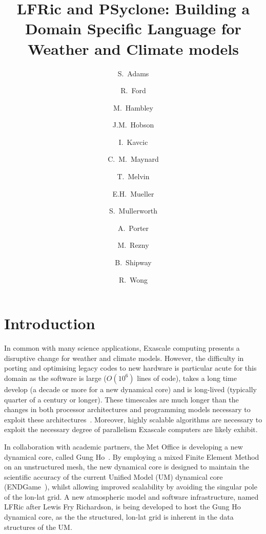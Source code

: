 \documentclass[times]{elsarticle}
\begin{document}
\begin{frontmatter}

\title{LFRic and PSyclone: Building a Domain Specific Language for Weather and Climate models}

\author[met]{S.~Adams}
\author[hartree]{R.~Ford}
\author[met]{M.~Hambley}
\author[met]{J.M.~Hobson}
\author[met]{I.~Kavcic}
\author[met,read]{C.~M.~Maynard}
\author[met]{T.~Melvin}
\author[bath]{E.H.~Mueller}
\author[met]{S.~Mullerworth}
\author[hartree]{A.~Porter}
\author[downunder]{M.~Rezny}
\author[met]{B.~Shipway}
\author[met]{R.~Wong}




\address[met]{Met Office, FitzRoy Road, Exeter, EX1 3PB}
\address[read]{Department of Computer Science, Polly Vacher Building,
  University of Reading, Reading, UK, RG6 6AY}
\address[bath]{Department of Mathematics, University of Bath, Bath}
\address[downunder]{Monash University, Melbourne, Australia}
\address[hartree]{Hartree Centre, STFC Daresbury, Grim up North}

\begin{abstract}
\end{abstract}

\begin{keyword}

\end{keyword}

\end{frontmatter}

\section{Introduction}
In common with many science applications, Exascale computing presents
a disruptive change for weather and climate models. However, the
difficulty in porting and optimising legacy codes to new hardware is
particular acute for this domain as the software is large ($O(10^6)$
lines of code), takes a long time develop (a decade or more for a new
dynamical core) and is long-lived (typically quarter of a century or longer). These
timescales are much longer than the changes in both processor
architectures and programming models necessary to exploit these
architectures~\cite{gmd-2017-186}. Moreover, highly scalable
algorithms are necessary to exploit the necessary degree of
parallelism Exascale computers are likely exhibit.

In collaboration with academic partners, the Met Office is developing
a new dynamical core, called Gung Ho~\cite{MELVIN2018342}. By
employing a mixed Finite Element Method on an unstructured mesh, the
new dynamical core is designed to maintain the scientific accuracy of
the current Unified Model (UM) dynamical core (ENDGame~\cite{QJ:QJ2235}),
whilst allowing improved scalability by avoiding the singular pole of
the lon-lat grid. A new atmospheric model and software infrastructure,
named LFRic after Lewis Fry Richardson, is being developed to host the
Gung Ho dynamical core, as the the structured, lon-lat grid is inherent in the
data structures of the UM.
\end{document}

